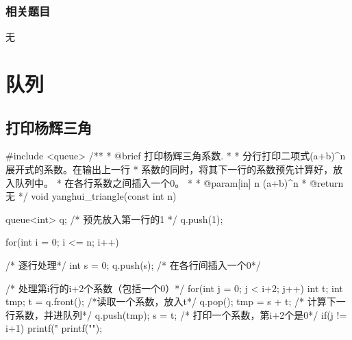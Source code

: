 \subsubsection{相关题目}
\begindot
\item 无
\myenddot


\section{队列} %


\subsection{打印杨辉三角}

\begin{Codex}[label=yanghui_triangle.cpp]
#include <queue>
/**
 * @brief 打印杨辉三角系数.
 *
 * 分行打印二项式(a+b)^n展开式的系数。在输出上一行
 * 系数的同时，将其下一行的系数预先计算好，放入队列中。
 * 在各行系数之间插入一个0。
 *
 * @param[in] n (a+b)^n
 * @return 无
 */
void yanghui_triangle(const int n) {
    queue<int> q;
    /* 预先放入第一行的1 */
    q.push(1);

    for(int i = 0; i <= n; i++) {     /* 逐行处理*/
        int s = 0;
        q.push(s);      /* 在各行间插入一个0*/

        /* 处理第i行的i+2个系数（包括一个0）*/
        for(int j = 0; j < i+2; j++) {
            int t;
            int tmp;
            t = q.front();  /*读取一个系数，放入t*/
            q.pop();
            tmp = s + t;      /* 计算下一行系数，并进队列*/
            q.push(tmp);
            s = t;            /* 打印一个系数，第i+2个是0*/
            if(j != i+1) {
                printf("%
            }
        }
        printf("\n");
    }
}
\end{Codex}
